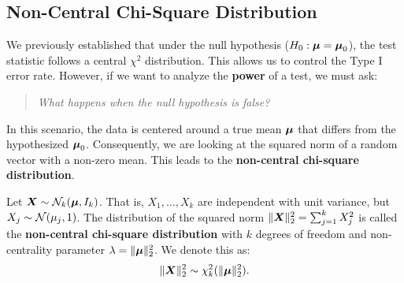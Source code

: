 %
%

\subsection{Non-Central Chi-Square Distribution}
\label{sub:Non-Central Chi-Square Distribution}

We previously established that under the null hypothesis ($H_0: \boldsymbol{\mu} = \boldsymbol{\mu}_0$), the test statistic follows a central $\chi^2$ distribution. This allows us to control the Type I error rate.
However, if we want to analyze the \textbf{power} of a test, we must ask: 
\begin{quote}
\textit{What happens when the null hypothesis is false?}
\end{quote}
In this scenario, the data is centered around a true mean $\boldsymbol{\mu}$ that differs from the hypothesized $\boldsymbol{\mu}_0$. Consequently, we are looking at the squared norm of a random vector with a non-zero mean. This leads to the \textbf{non-central chi-square distribution}.

\begin{definition}
    Let $\boldsymbol{X} \sim \mathcal{N}_{k}(\boldsymbol{\mu}, I_{k})$. That is, $X_1, \dots, X_k$ are independent with unit variance, but $X_j \sim \mathcal{N}(\mu_j, 1)$.
    The distribution of the squared norm $\|\boldsymbol{X}\|^2_{2} = \sum_{j=1}^{k} X^2_{j}$ is called the \textbf{non-central chi-square distribution} with $k$ degrees of freedom and non-centrality parameter $\lambda = \|\boldsymbol{\mu}\|^2_{2}$. We denote this as:
    \[
        \|\boldsymbol{X}\|^2_{2} \sim \chi^2_{k}(\|\boldsymbol{\mu}\|^2_{2}).
    \]
\end{definition}

